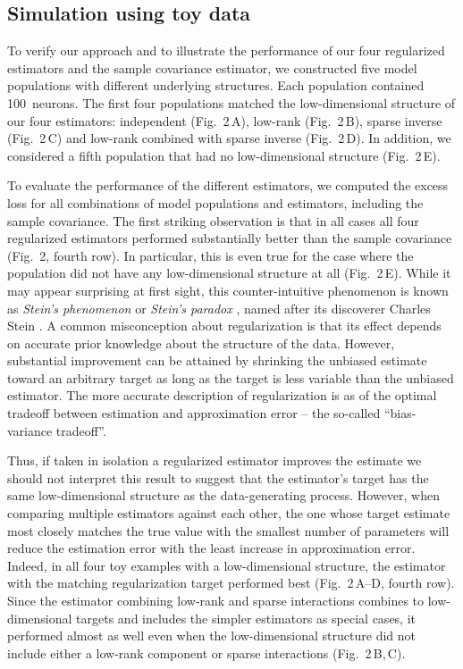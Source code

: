 \subsection*{Simulation using toy data}

To verify our approach and to illustrate the performance of our four regularized estimators and the sample covariance estimator, we constructed five model populations with different underlying structures. Each population contained 100~neurons. The first four populations matched the low-dimensional structure of our four estimators: independent (Fig.~2\,A), low-rank (Fig.~2\,B), sparse inverse (Fig.~2\,C) and low-rank combined with sparse inverse (Fig.~2\,D).  In addition, we considered a fifth population that had no low-dimensional structure (Fig.~2\,E).

To evaluate the performance of the different estimators, we computed the excess loss for all combinations of model populations and estimators, including the sample covariance. The first striking observation is that in all cases all four regularized estimators performed substantially better than the sample covariance (Fig.~2, fourth row). In particular, this is even true for the case where the population did not have any low-dimensional structure at all (Fig.~2\,E). While it may appear surprising at first sight, this counter-intuitive phenomenon is known as \emph{Stein's phenomenon} or \emph{Stein's paradox} \cite{Efron:1977}, named after its discoverer Charles Stein \cite{Stein:1956}. A common misconception about regularization is that its effect depends on accurate prior knowledge about the structure of the data. However, substantial improvement can be attained by shrinking the unbiased estimate toward an arbitrary target as long as the target is less variable than the unbiased estimator. The more accurate description of regularization is as of the optimal tradeoff between estimation and approximation error -- the so-called ``bias-variance tradeoff''.

Thus, if taken in isolation a regularized estimator improves the estimate we should not interpret this result to suggest that the estimator's target has the same low-dimensional structure as the data-generating process. However, when comparing multiple estimators against each other, the one whose target estimate most closely matches the true value with the smallest number of parameters will reduce the estimation error with the least increase in approximation error. Indeed, in all four toy examples with a low-dimensional structure, the estimator with the matching regularization target performed best (Fig.~2\,A--D, fourth row). Since the estimator combining low-rank and sparse interactions combines to low-dimensional targets and includes the simpler estimators as special cases, it performed almost as well even when the low-dimensional structure did not include either a low-rank component or sparse interactions (Fig.~2\,B,\,C).  

